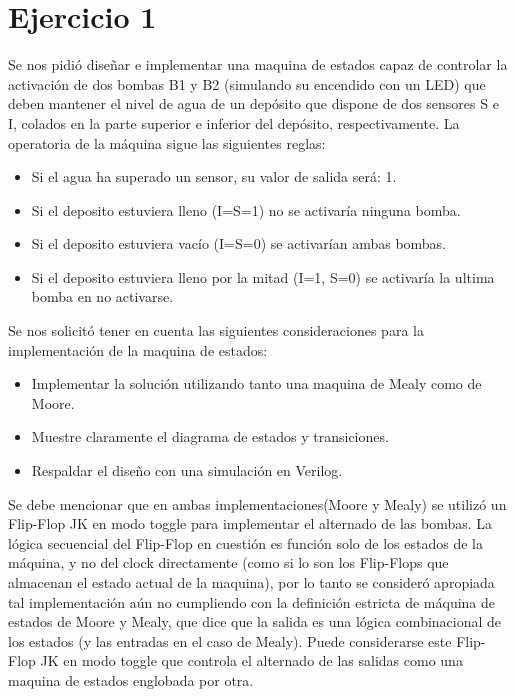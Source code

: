\documentclass[10pt,a4paper]{article}
\begin{document}
\part*{Ejercicio 1}
Se nos pidió diseñar e implementar una maquina de estados capaz de controlar la activación de dos bombas B1 y B2 (simulando su encendido con un LED) que deben mantener el nivel de agua de un depósito que dispone de dos sensores S e I, colados en la parte superior e inferior del depósito, respectivamente. La operatoria de la máquina sigue las siguientes reglas:

\begin{itemize}
\item Si el agua ha superado un sensor, su valor de salida será: 1.
\item Si el deposito estuviera lleno (I=S=1) no se activaría ninguna bomba.
\item Si el deposito estuviera vacío (I=S=0) se activarían ambas bombas.
\item Si el deposito estuviera lleno por la mitad (I=1, S=0) se activaría la ultima bomba en no activarse. 
\end{itemize}

Se nos solicitó tener en cuenta las siguientes consideraciones para la implementación de la maquina de estados:

\begin{itemize}
\item Implementar la solución utilizando tanto una maquina de Mealy como de Moore.
\item Muestre claramente el diagrama de estados y transiciones.
\item Respaldar el diseño con una simulación en Verilog.
\end{itemize} 

Se debe mencionar que en ambas implementaciones(Moore y Mealy) se utilizó un Flip-Flop JK en modo toggle para implementar el alternado de las bombas. La lógica secuencial del Flip-Flop en cuestión es función solo de los estados de la máquina, y no del clock directamente (como si lo son los Flip-Flops que almacenan el estado actual de la maquina), por lo tanto se consideró apropiada tal implementación aún no cumpliendo con la definición estricta de máquina de estados de Moore y Mealy, que dice que la salida es una lógica combinacional de los estados (y las entradas en el caso de Mealy). Puede considerarse este Flip-Flop JK en modo toggle que controla el alternado de las salidas como una maquina de estados englobada por otra. 
\end{document}
